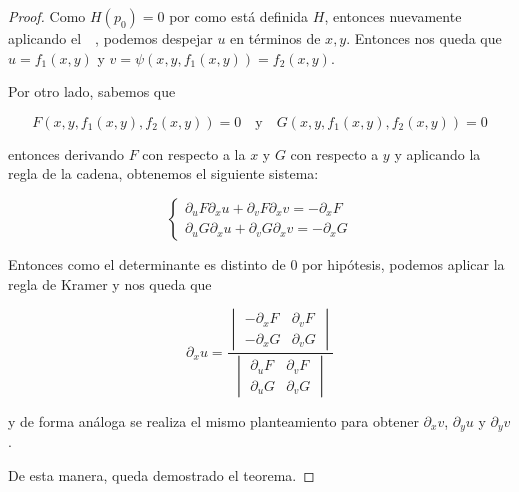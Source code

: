 \begin{proof}
    Como $H(p_0) = 0$ por como está definida $H$, entonces nuevamente aplicando el~\TFIii~, podemos despejar $u$ en términos de $x, y$. Entonces nos queda que $u = f_1(x,y)$ y $v = \psi\left( x, y, f_1(x,y) \right) = f_2 (x,y)$.
    
    Por otro lado, sabemos que
    
    \[
    F(x,y,f_1(x,y),f_2(x,y)) = 0 \quad \text{y} \quad G(x,y,f_1(x,y),f_2(x,y)) = 0
    \]
    
    \noindent entonces derivando $F$ con respecto a la $x$ y $G$ con respecto a $y$ y aplicando la regla de la cadena, obtenemos el siguiente sistema:
    
    \[
    \begin{cases}
        \partial_uF \partial_xu + \partial_vF \partial_xv = -\partial_xF \\
        \partial_uG \partial_xu + \partial_vG \partial_xv = -\partial_xG
    \end{cases}
    \]
    
    Entonces como el determinante es distinto de $0$ por hipótesis, podemos aplicar la regla de Kramer y nos queda que
    
    \[
    \partial_xu =
    \dfrac{
        \begin{vmatrix}
            -\partial_xF & \partial_vF \\
            -\partial_xG & \partial_vG
        \end{vmatrix}
    }{
        \begin{vmatrix}
            \partial_uF & \partial_vF \\
            \partial_uG & \partial_vG
        \end{vmatrix}
    }
    \]
    
    \noindent y de forma análoga se realiza el mismo planteamiento para obtener $\partial_xv$, $\partial_yu$ y $\partial_yv$.
    
    De esta manera, queda demostrado el teorema.
\end{proof}